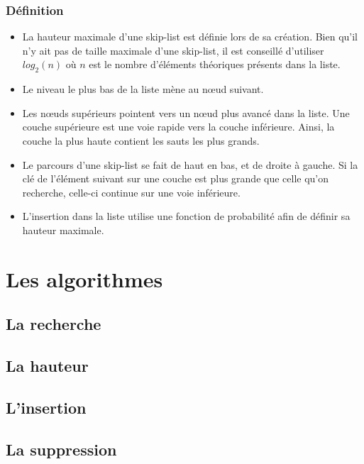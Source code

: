 \documentclass[a4paper, 12pt]{article}
\begin{document}
	\subsubsection*{Définition}
	\begin{itemize}
		\item La hauteur maximale d'une skip-list est définie lors de sa création. Bien qu'il n'y ait pas de taille maximale d'une skip-list, il est conseillé d'utiliser $log_2(n)$ où $n$ est le nombre d'éléments théoriques présents dans la liste. 
		\item Le niveau le plus bas de la liste mène au nœud suivant. 
		\item Les nœuds supérieurs pointent vers un nœud plus avancé dans la liste.  Une couche supérieure est une voie rapide vers la couche inférieure. Ainsi, la couche la plus haute contient les sauts les plus grands.
		\item Le parcours d'une skip-list se fait de haut en bas, et de droite à gauche. Si la clé de l'élément suivant sur une couche est plus grande que celle qu'on recherche, celle-ci continue sur une voie inférieure.
		\item L'insertion dans la liste utilise une fonction de probabilité afin de définir sa hauteur maximale.
	\end{itemize}
	
	\section{Les algorithmes}
	
	\subsection{La recherche}
	
	\subsection{La hauteur}
	
	\subsection{L'insertion}
	
	\subsection{La suppression}
	
	
\end{document}
